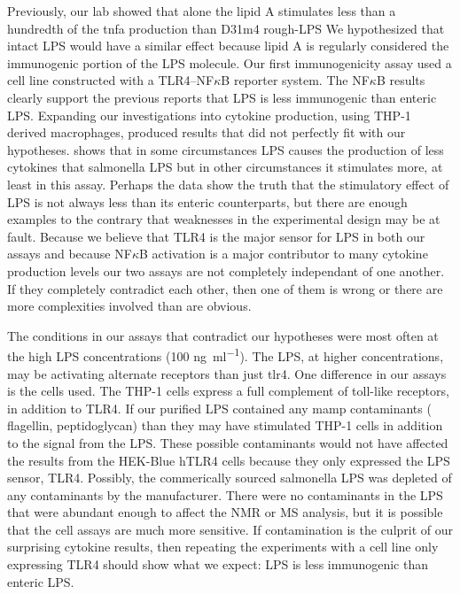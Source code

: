 Previously, our lab showed that alone the \caulobacter{} lipid A stimulates less
than a hundredth of the \ac{tnfa} production than \ecoli{} D31m4
rough-\ac{LPS} We hypothesized that intact
\caulobacter{} \ac{LPS} would have a similar effect because lipid A is regularly
considered the immunogenic portion of the \ac{LPS} molecule. Our  first
immunogenicity assay used a cell line constructed with a TLR4--NF$\kappa$B
reporter system. The NF$\kappa$B results clearly support the previous reports
that \caulobacter{} \ac{LPS} is less immunogenic than enteric \ac{LPS}.
Expanding our investigations into cytokine production, using THP-1 derived
macrophages, produced results that  did not perfectly fit with our hypotheses.
 shows that in some  circumstances \caulobacter{}
\ac{LPS} causes the production of less cytokines that \ac{salmonella} \ac{LPS}
but in other circumstances it stimulates more, at least in this assay. Perhaps
the data show the truth that the stimulatory effect of \caulobacter{} \ac{LPS}
is not always less than its enteric counterparts, but there are enough examples
to the contrary that weaknesses in the experimental design may be at fault.
Because we believe that TLR4 is the major sensor for \ac{LPS} in both our assays
and because NF$\kappa$B activation is a major contributor to many cytokine
production levels our two assays are not completely independant of one another. If they completely contradict each other, then one of them is wrong or there are more complexities involved than are obvious. 

The conditions in our assays that contradict our hypotheses were most often at
the high \ac{LPS} concentrations (100 \si{\nano\gram\per\milli\litre}). The
\caulobacter \ac{LPS}, at higher concentrations, may be activating alternate receptors than just \ac{tlr4}.
One difference in our assays is the cells used. The THP-1 cells express a full complement of toll-like receptors, in addition to TLR4. If our purified \caulobacter{} \ac{LPS} contained any \ac{mamp}  contaminants (\eg{} flagellin, peptidoglycan) than they may have stimulated THP-1 cells in addition to the signal from the \ac{LPS}. These possible contaminants would not have affected the results from the HEK-Blue hTLR4 cells because they only expressed the \ac{LPS} sensor, TLR4. Possibly, the commerically sourced \ac{salmonella} \ac{LPS} was  depleted of any contaminants by the manufacturer. There were no contaminants in the \caulobacter{} \ac{LPS} that were abundant enough to affect the \ac{NMR} or \ac{MS} analysis, but it is possible that the cell assays are  much more sensitive. If contamination is the culprit of our surprising cytokine results, then repeating the experiments with a cell line only expressing TLR4 should show what we expect: \caulobacter{} \ac{LPS} is less immunogenic than enteric \ac{LPS}.